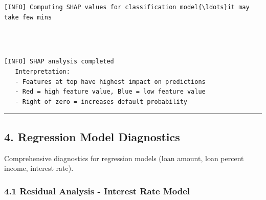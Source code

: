 \documentclass[11pt]{article}
\begin{document}
    \begin{Verbatim}[commandchars=\\\{\}]
[INFO] Computing SHAP values for classification model{\ldots}it may take few mins

    \end{Verbatim}

    \begin{center}
    \end{center}
    { \hspace*{\fill} \\}
    
    \begin{Verbatim}[commandchars=\\\{\}]

[INFO] SHAP analysis completed
   Interpretation:
   - Features at top have highest impact on predictions
   - Red = high feature value, Blue = low feature value
   - Right of zero = increases default probability
    \end{Verbatim}

    \begin{center}\rule{0.5\linewidth}{0.5pt}\end{center}

\subsection{4. Regression Model
Diagnostics}\label{regression-model-diagnostics}

Comprehensive diagnostics for regression models (loan amount, loan
percent income, interest rate).

    \subsubsection{4.1 Residual Analysis - Interest Rate
Model}\label{residual-analysis---interest-rate-model}
\end{document}
